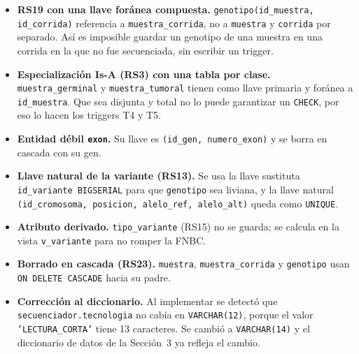 \begin{itemize}
  \item \textbf{RS19 con una llave foránea compuesta.} \texttt{genotipo(id\_\allowbreak{}muestra, id\_\allowbreak{}corrida)} referencia a
        \texttt{muestra\_\allowbreak{}corrida}, no a \texttt{muestra} y \texttt{corrida} por separado. Así es imposible guardar
        un genotipo de una muestra en una corrida en la que no fue secuenciada, sin escribir un trigger.
  \item \textbf{Especialización Is-A (RS3) con una tabla por clase.} \texttt{muestra\_\allowbreak{}germinal} y
        \texttt{muestra\_\allowbreak{}tumoral} tienen como llave primaria y foránea a \texttt{id\_\allowbreak{}muestra}. Que sea disjunta y
        total no lo puede garantizar un \texttt{CHECK}, por eso lo hacen los triggers T4 y T5.
  \item \textbf{Entidad débil \texttt{exon}.} Su llave es \texttt{(id\_\allowbreak{}gen, numero\_\allowbreak{}exon)} y se borra en cascada con su gen.
  \item \textbf{Llave natural de la variante (RS13).} Se usa la llave sustituta \texttt{id\_\allowbreak{}variante BIGSERIAL} para que
        \texttt{genotipo} sea liviana, y la llave natural \texttt{(id\_\allowbreak{}cromosoma, posicion, alelo\_\allowbreak{}ref, alelo\_\allowbreak{}alt)}
        queda como \texttt{UNIQUE}.
  \item \textbf{Atributo derivado.} \texttt{tipo\_\allowbreak{}variante} (RS15) no se guarda; se calcula en la vista \texttt{v\_\allowbreak{}variante}
        para no romper la FNBC.
  \item \textbf{Borrado en cascada (RS23).} \texttt{muestra}, \texttt{muestra\_\allowbreak{}corrida} y \texttt{genotipo} usan
        \texttt{ON DELETE CASCADE} hacia su padre.
  \item \textbf{Corrección al diccionario.} Al implementar se detectó que \texttt{secuenciador.tecnologia} no cabía en
        \texttt{VARCHAR(12)}, porque el valor \texttt{'LECTURA\_\allowbreak{}CORTA'} tiene 13 caracteres. Se cambió a \texttt{VARCHAR(14)}
        y el diccionario de datos de la Sección~3 ya refleja el cambio.
\end{itemize}

